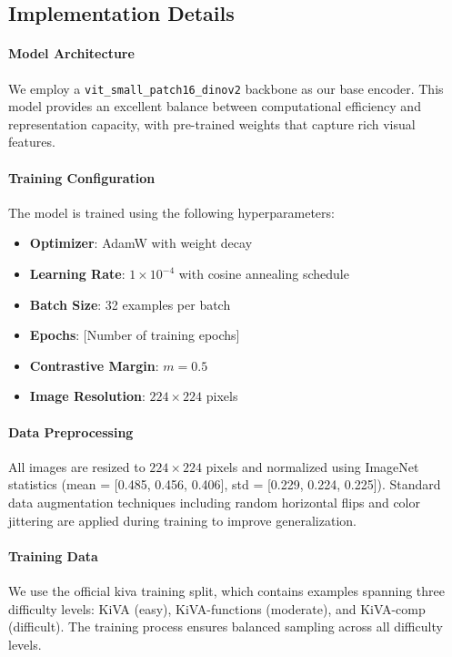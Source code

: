 \documentclass[twocolumn]{article} %
\begin{document}
\subsection{Implementation Details}

\paragraph{Model Architecture}
We employ a \texttt{vit\_small\_patch16\_dinov2} backbone as our base encoder. This model provides an excellent balance between computational efficiency and representation capacity, with pre-trained weights that capture rich visual features.

\paragraph{Training Configuration}
The model is trained using the following hyperparameters:
\begin{itemize}
\item \textbf{Optimizer}: AdamW with weight decay
\item \textbf{Learning Rate}: $1 \times 10^{-4}$ with cosine annealing schedule
\item \textbf{Batch Size}: 32 examples per batch
\item \textbf{Epochs}: [Number of training epochs]
\item \textbf{Contrastive Margin}: $m = 0.5$
\item \textbf{Image Resolution}: $224 \times 224$ pixels
\end{itemize}

\paragraph{Data Preprocessing}
All images are resized to $224 \times 224$ pixels and normalized using ImageNet statistics (mean = [0.485, 0.456, 0.406], std = [0.229, 0.224, 0.225]). Standard data augmentation techniques including random horizontal flips and color jittering are applied during training to improve generalization.

\paragraph{Training Data}
We use the official \gls{kiva} training split, which contains examples spanning three difficulty levels: KiVA (easy), KiVA-functions (moderate), and KiVA-comp (difficult). The training process ensures balanced sampling across all difficulty levels.
\end{document}
